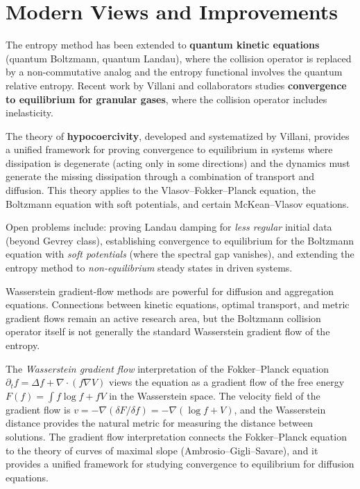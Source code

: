 \section{Modern Views and Improvements}\label{ch2010cedricvillani:modern-views-and-improvements}

The entropy method has been extended to \textbf{quantum kinetic equations} (quantum Boltzmann, quantum Landau), where the collision operator is replaced by a non-commutative analog and the entropy functional involves the quantum relative entropy. Recent work by Villani and collaborators studies \textbf{convergence to equilibrium for granular gases}, where the collision operator includes inelasticity.

The theory of \textbf{hypocoercivity}, developed and systematized by Villani, provides a unified framework for proving convergence to equilibrium in systems where dissipation is degenerate (acting only in some directions) and the dynamics must generate the missing dissipation through a combination of transport and diffusion. This theory applies to the Vlasov--Fokker--Planck equation, the Boltzmann equation with soft potentials, and certain McKean--Vlasov equations.

Open problems include: proving Landau damping for \emph{less regular} initial data (beyond Gevrey class), establishing convergence to equilibrium for the Boltzmann equation with \emph{soft potentials} (where the spectral gap vanishes), and extending the entropy method to \emph{non-equilibrium} steady states in driven systems.

Wasserstein gradient-flow methods are powerful for diffusion and aggregation
equations. Connections between kinetic equations, optimal transport, and
metric gradient flows remain an active research area, but the Boltzmann
collision operator itself is not generally the standard Wasserstein gradient
flow of the entropy.

The \emph{Wasserstein gradient flow} interpretation of the Fokker--Planck equation $\partial_t f = \Delta f + \nabla \cdot (f \nabla V)$ views the equation as a gradient flow of the free energy $F(f) = \int f \log f + f V$ in the Wasserstein space. The velocity field of the gradient flow is $v = -\nabla(\delta F / \delta f) = -\nabla(\log f + V)$, and the Wasserstein distance provides the natural metric for measuring the distance between solutions. The gradient flow interpretation connects the Fokker--Planck equation to the theory of curves of maximal slope (Ambrosio--Gigli--Savare), and it provides a unified framework for studying convergence to equilibrium for diffusion equations.

